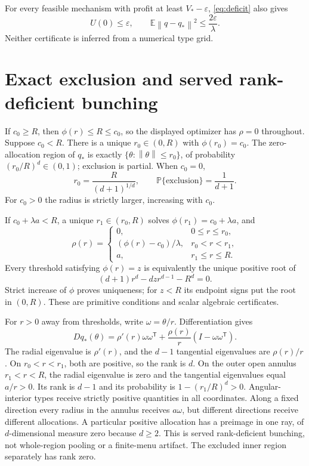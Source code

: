 \documentclass[11pt,a4paper]{article}
\numberwithin{equation}{section}
\newcommand{\E}{\mathbb E}
\newcommand{\Prob}{\mathbb P}
\newcommand{\norm}[1]{\left\lVert #1\right\rVert}
\newcommand{\T}{\mathsf T}
\begin{document}
For every feasible mechanism with profit at least \(V_*-\varepsilon\),
\eqref{eq:deficit} also gives
\begin{equation}\label{eq:stability}
 U(0)\le\varepsilon,\qquad
 \E\norm{q-q_*}^2\le\frac{2\varepsilon}{\lambda}.
\end{equation}
Neither certificate is inferred from a numerical type grid.

\section{Exact exclusion and served rank-deficient bunching}\label{sec:geometry}
If \(c_0\ge R\), then \(\phi(r)\le R\le c_0\), so the displayed
optimizer has \(\rho=0\) throughout.
Suppose \(c_0<R\). There is a unique \(r_0\in(0,R)\) with
\(\phi(r_0)=c_0\). The zero-allocation region of \(q_*\) is exactly
\(\{\theta:\norm\theta\le r_0\}\), of probability
\((r_0/R)^d\in(0,1)\); exclusion is partial.
When \(c_0=0\),
\[
 r_0=\frac R{(d+1)^{1/d}},\qquad
 \Prob\{\text{exclusion}\}=\frac1{d+1}.
\]
For \(c_0>0\) the radius is strictly larger, increasing with \(c_0\).

If \(c_0+\lambda a<R\), a unique \(r_1\in(r_0,R)\) solves
\(\phi(r_1)=c_0+\lambda a\), and
\[
 \rho(r)=
 \begin{cases}
 0,&0\le r\le r_0,\\
 (\phi(r)-c_0)/\lambda,&r_0<r<r_1,\\
 a,&r_1\le r\le R.
 \end{cases}
\]
Every threshold satisfying \(\phi(r)=z\) is equivalently the unique
positive root of
\begin{equation}\label{eq:thresholdpoly}
 (d+1)r^d-dzr^{d-1}-R^d=0.
\end{equation}
Strict increase of \(\phi\) proves uniqueness; for \(z<R\) its
endpoint signs put the root in \((0,R)\).
These are primitive conditions and scalar algebraic certificates.

For \(r>0\) away from thresholds, write \(\omega=\theta/r\).
Differentiation gives
\begin{equation}\label{eq:rankmatrix}
 Dq_*(\theta)=\rho'(r)\omega\omega^\T
       +\frac{\rho(r)}r(I-\omega\omega^\T).
\end{equation}
The radial eigenvalue is \(\rho'(r)\), and the \(d-1\) tangential
eigenvalues are \(\rho(r)/r\).
On \(r_0<r<r_1\), both are positive, so the rank is \(d\).
On the outer open annulus \(r_1<r<R\), the radial eigenvalue is zero
and the tangential eigenvalues equal \(a/r>0\).
Its rank is \(d-1\) and its probability is \(1-(r_1/R)^d>0\).
Angular-interior types receive strictly positive quantities in all
coordinates. Along a fixed direction every radius in the annulus
receives \(a\omega\), but different directions receive different
allocations. A particular positive allocation has a preimage in one
ray, of \(d\)-dimensional measure zero because \(d\ge2\).
This is served rank-deficient bunching, not whole-region pooling or
a finite-menu artifact. The excluded inner region separately has rank zero.
\end{document}
